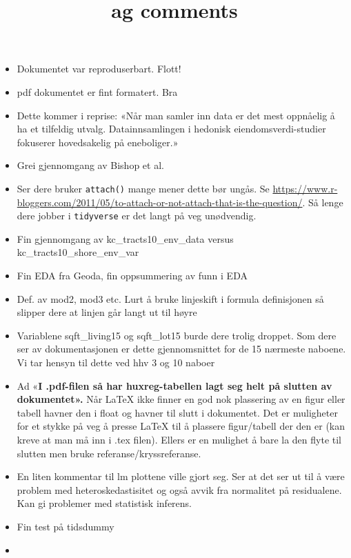 \documentclass[
]{article}
\title{ag comments}
\author{}
\date{\vspace{-2.5em}}
\begin{document}
\maketitle

\begin{itemize}
\item
  Dokumentet var reproduserbart. Flott!
\item
  pdf dokumentet er fint formatert. Bra
\item
  Dette kommer i reprise: «Når man samler inn data er det mest oppnåelig
  å ha et tilfeldig utvalg. Datainnsamlingen i hedonisk
  eiendomsverdi-studier fokuserer hovedsakelig på eneboliger.»
\item
  Grei gjennomgang av Bishop et al.
\item
  Ser dere bruker \texttt{attach()} mange mener dette bør ungås. Se
  \url{https://www.r-bloggers.com/2011/05/to-attach-or-not-attach-that-is-the-question/}.
  Så lenge dere jobber i \texttt{tidyverse} er det langt på veg
  unødvendig.
\item
  Fin gjennomgang av kc\_tracts10\_env\_data versus
  kc\_tracts10\_shore\_env\_var
\item
  Fin EDA fra Geoda, fin oppsummering av funn i EDA
\item
  Def. av mod2, mod3 etc. Lurt å bruke linjeskift i formula definisjonen
  så slipper dere at linjen går langt ut til høyre
\item
  Variablene sqft\_living15 og sqft\_lot15 burde dere trolig droppet.
  Som dere ser av dokumentasjonen er dette gjennomsnittet for de 15
  nærmeste naboene. Vi tar hensyn til dette ved hhv 3 og 10 naboer
\item
  Ad «\textbf{I .pdf-filen så har huxreg-tabellen lagt seg helt på
  slutten av dokumentet».} Når LaTeX ikke finner en god nok plassering
  av en figur eller tabell havner den i float og havner til slutt i
  dokumentet. Det er muligheter for et stykke på veg å presse LaTeX til
  å plassere figur/tabell der den er (kan kreve at man må inn i .tex
  filen). Ellers er en mulighet å bare la den flyte til slutten men
  bruke referanse/kryssreferanse.
\item
  En liten kommentar til lm plottene ville gjort seg. Ser at det ser ut
  til å være problem med heteroskedastisitet og også avvik fra
  normalitet på residualene. Kan gi problemer med statistisk inferens.
\item
  Fin test på tidsdummy
\item ~
  \hypertarget{moran-i-statistic-standard-deviate-28.301-p-value}{%
}
\end{itemize}
\end{document}
